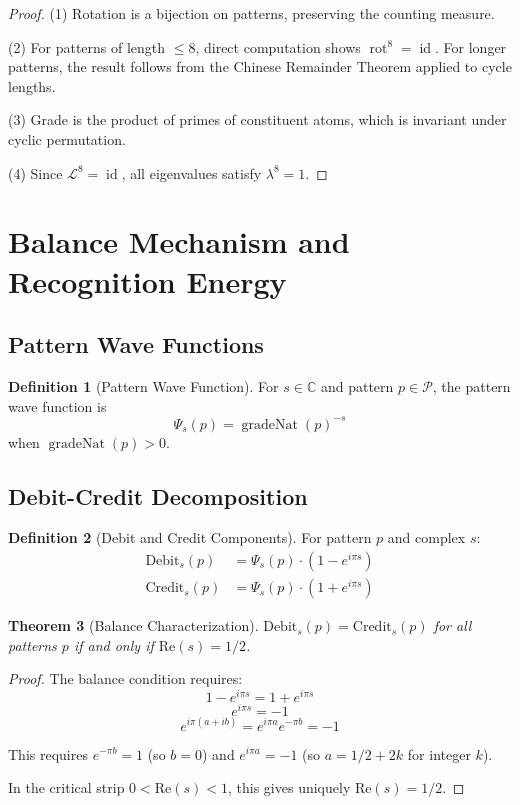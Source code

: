\documentclass[12pt]{article}
\newtheorem{theorem}{Theorem}[section]
\theoremstyle{definition}
\newtheorem{definition}[theorem]{Definition}
\theoremstyle{remark}
\newcommand{\C}{\mathbb{C}}
\DeclareMathOperator{\gradeNat}{gradeNat}
\DeclareMathOperator{\id}{id}
\DeclareMathOperator{\rot}{rot}
\newcommand{\tick}{\mathcal{L}}
\newcommand{\Pattern}{\mathcal{P}}
\begin{document}
\begin{proof}
(1) Rotation is a bijection on patterns, preserving the counting measure.

(2) For patterns of length $\leq 8$, direct computation shows $\rot^8 = \id$. For longer patterns, the result follows from the Chinese Remainder Theorem applied to cycle lengths.

(3) Grade is the product of primes of constituent atoms, which is invariant under cyclic permutation.

(4) Since $\tick^8 = \id$, all eigenvalues satisfy $\lambda^8 = 1$.
\end{proof}

\section{Balance Mechanism and Recognition Energy}

\subsection{Pattern Wave Functions}

\begin{definition}[Pattern Wave Function]
For $s \in \C$ and pattern $p \in \Pattern$, the pattern wave function is
$$\Psi_s(p) = \gradeNat(p)^{-s}$$
when $\gradeNat(p) > 0$.
\end{definition}

\subsection{Debit-Credit Decomposition}

\begin{definition}[Debit and Credit Components]
For pattern $p$ and complex $s$:
\begin{align}
\text{Debit}_s(p) &= \Psi_s(p) \cdot (1 - e^{i\pi s})\\
\text{Credit}_s(p) &= \Psi_s(p) \cdot (1 + e^{i\pi s})
\end{align}
\end{definition}

\begin{theorem}[Balance Characterization]
$\text{Debit}_s(p) = \text{Credit}_s(p)$ for all patterns $p$ if and only if $\text{Re}(s) = 1/2$.
\end{theorem}

\begin{proof}
The balance condition requires:
$$1 - e^{i\pi s} = 1 + e^{i\pi s}$$
$$e^{i\pi s} = -1$$
$$e^{i\pi(a+ib)} = e^{i\pi a}e^{-\pi b} = -1$$

This requires $e^{-\pi b} = 1$ (so $b = 0$) and $e^{i\pi a} = -1$ (so $a = 1/2 + 2k$ for integer $k$).

In the critical strip $0 < \text{Re}(s) < 1$, this gives uniquely $\text{Re}(s) = 1/2$.
\end{proof}
\end{document}

